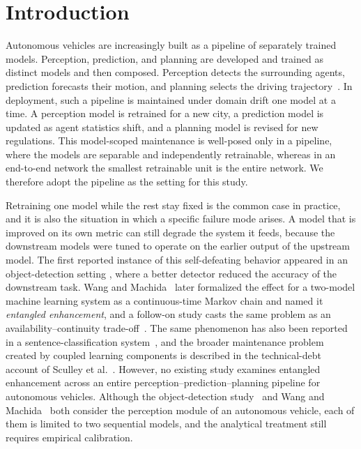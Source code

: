 \documentclass[conference]{IEEEtran}
\begin{document}
\section{Introduction}
Autonomous vehicles are increasingly built as a pipeline of separately trained
models. Perception, prediction, and planning are developed and trained as
distinct models and then composed. Perception detects the surrounding agents,
prediction forecasts their motion, and planning selects the driving
trajectory~\cite{chen2024e2esurvey,hu2023uniad}. In deployment, such a pipeline
is maintained under domain drift one model at a time. A perception model is
retrained for a new city, a prediction model is updated as agent statistics
shift, and a planning model is revised for new regulations. This model-scoped
maintenance is well-posed only in a pipeline, where the models are separable and
independently retrainable, whereas in an end-to-end network the smallest
retrainable unit is the entire network. We therefore adopt the pipeline as the
setting for this study.

Retraining one model while the rest stay fixed is the common case in practice,
and it is also the situation in which a specific failure mode arises. A model that is improved on its own
metric can still degrade the system it feeds, because the downstream models were
tuned to operate on the earlier output of the upstream model. The first reported
instance of this self-defeating behavior appeared in an object-detection setting
\cite{wu2021fixesthatfail}, where a better detector reduced the
accuracy of the downstream task. Wang and Machida~\cite{wang2024compsac} later
formalized the effect for a two-model machine learning system as a
continuous-time Markov chain and named it \emph{entangled enhancement}, and a
follow-on study casts the same problem as an availability--continuity
trade-off~\cite{wang2025issre}. The same phenomenon has also been reported in a
sentence-classification system~\cite{wang2025issre}, and the broader maintenance
problem created by coupled learning components is described in the technical-debt
account of Sculley et al.~\cite{sculley2015hidden}. However, no existing study examines entangled
enhancement across an entire perception--prediction--planning pipeline for
autonomous vehicles. Although the object-detection
study~\cite{wu2021fixesthatfail} and Wang and
Machida~\cite{wang2024compsac} both consider the perception module of an
autonomous vehicle, each of them is limited to two sequential models, and the
analytical treatment still requires empirical calibration.
\end{document}
